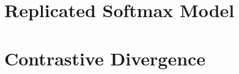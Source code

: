 \documentclass[a4paper,12pt,oneside,onecolumn,final,fleqn]{config/UERJ/repUERJ}
\begin{document}
%

\mainmatter



%

%



\chapter{Replicated Softmax Model}%
\label{appen:rsm}%


\chapter{Contrastive Divergence}%
\label{appen:cd}%


%



%

%


\end{document}
